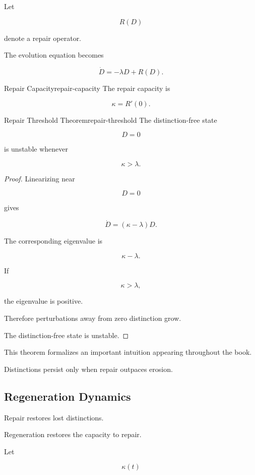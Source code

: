 \documentclass[12pt,twoside,openright]{book}
\begin{document}
Let

\[
R(D)
\]

denote a repair operator.

The evolution equation becomes

\[
\dot D
=

-\lambda D
+
R(D).
\]

\begin{definition}{Repair Capacity}{repair-capacity}
The repair capacity is

\[
\kappa
=

R'(0).
\]
\end{definition}

\begin{theorem}{Repair Threshold Theorem}{repair-threshold}
The distinction-free state

\[
D=0
\]

is unstable whenever

\[
\kappa>\lambda.
\]
\end{theorem}

\begin{proof}
Linearizing near

\[
D=0
\]

gives

\[
\dot D
=

(\kappa-\lambda)D.
\]

The corresponding eigenvalue is

\[
\kappa-\lambda.
\]

If

\[
\kappa>\lambda,
\]

the eigenvalue is positive.

Therefore perturbations away from zero distinction grow.

The distinction-free state is unstable.
\end{proof}

This theorem formalizes an important intuition appearing
throughout the book.

Distinctions persist only when repair outpaces erosion.

\subsection{Regeneration Dynamics}

Repair restores lost distinctions.

Regeneration restores the capacity to repair.

Let

\[
\kappa(t)
\]
\end{document}
